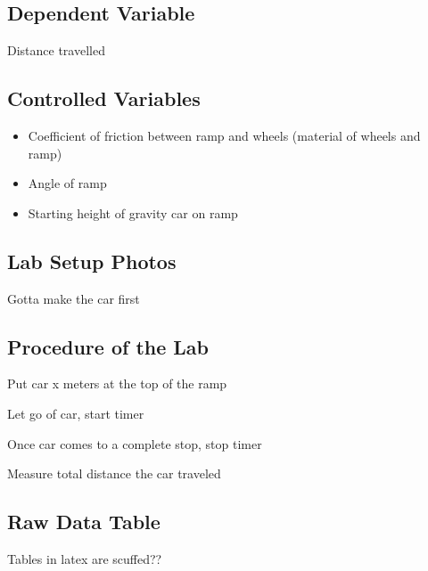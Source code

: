 \documentclass[12pt]{article}
\begin{document}
\subsection{Dependent Variable} Distance travelled

\subsection{Controlled Variables}
\begin{itemize}
    \item Coefficient of friction between ramp and wheels (material of wheels and ramp)
    \item Angle of ramp
    \item Starting height of gravity car on ramp
\end{itemize}

\subsection{Lab Setup Photos}

Gotta make the car first
\subsection{Procedure of the Lab}

Put car x meters at the top of the ramp

Let go of car, start timer

Once car comes to a complete stop, stop timer

Measure total distance the car traveled

\subsection{Raw Data Table}

Tables in latex are scuffed??
\end{document}
